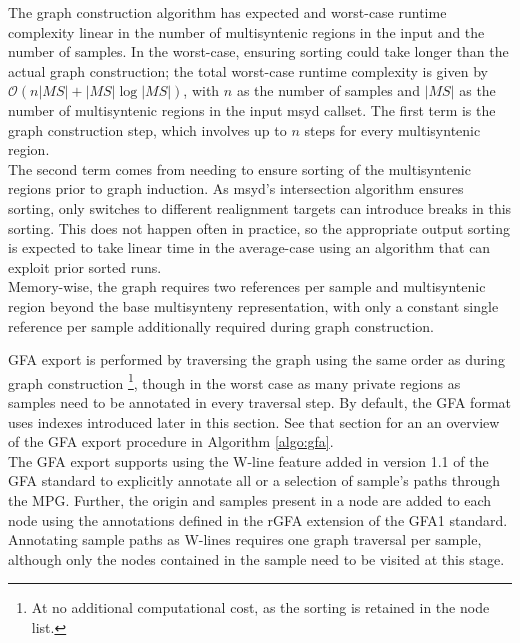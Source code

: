 The graph construction algorithm has expected and worst-case runtime complexity linear in the number of multisyntenic regions in the input and the number of samples.
In the worst-case, ensuring sorting could take longer than the actual graph construction; the total worst-case runtime complexity is given by $\mathcal{O}(n|MS| + |MS|\log|MS|)$, with $n$ as the number of samples and $|MS|$ as the number of multisyntenic regions in the input msyd callset.
The first term is the graph construction step, which involves up to $n$ steps for every multisyntenic region.\\
The second term comes from needing to ensure sorting of the multisyntenic regions prior to graph induction.
As msyd's intersection algorithm ensures sorting, only switches to different realignment targets can introduce breaks in this sorting.
This does not happen often in practice, so the appropriate output sorting is expected to take linear time in the average-case using an algorithm that can exploit prior sorted runs.\\%
Memory-wise, the graph requires two references per sample and multisyntenic region beyond the base multisynteny representation, with only a constant single reference per sample additionally required during graph construction.

GFA export is performed by traversing the graph using the same order as during graph construction
\footnote{At no additional computational cost, as the sorting is retained in the node list.},
though in the worst case as many private regions as samples need to be annotated in every traversal step.
By default, the GFA format uses indexes introduced later in this section.
See that section for an an overview of the GFA export procedure in Algorithm \ref{algo:gfa}.\\
The GFA export supports using the W-line feature added in version 1.1 of the GFA standard to explicitly annotate all or a selection of sample's paths through the MPG. %
Further, the origin and samples present in a node are added to each node using the annotations defined in the rGFA extension of the GFA1 standard.
Annotating sample paths as W-lines requires one graph traversal per sample, although only the nodes contained in the sample need to be visited at this stage.\\

